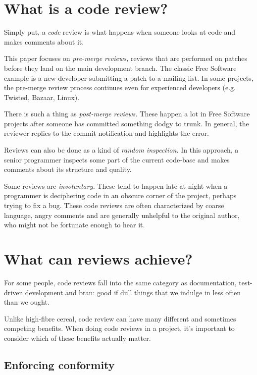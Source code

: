 \documentclass{article}
\begin{document}
\section{What is a code review?}

Simply put, a {\it code} review is what happens when someone looks at code and makes comments about it.

This paper focuses on {\it pre-merge reviews,} reviews that are performed on patches before they land on the main development branch. The classic Free Software example is a new developer submitting a patch to a mailing list. In some projects, the pre-merge review process continues even for experienced developers (e.g. Twisted, Bazaar, Linux).

There is such a thing as {\it post-merge reviews.} These happen a lot in Free Software projects after someone has committed something dodgy to trunk. In general, the reviewer replies to the commit notification and highlights the error.

Reviews can also be done as a kind of {\it random inspection.} In this approach, a senior programmer inspects some part of the current code-base and makes comments about its structure and quality.

Some reviews are {\it involuntary.} These tend to happen late at night when a programmer is deciphering code in an obscure corner of the project, perhaps trying to fix a bug. These code reviews are often characterized by coarse language, angry comments and are generally unhelpful to the original author, who might not be fortunate enough to hear it. 


\section{What can reviews achieve?}

For some people, code reviews fall into the same category as documentation, test-driven development and bran: good if dull things that we indulge in less often than we ought.

Unlike high-fibre cereal, code review can have many different and sometimes competing benefits. When doing code reviews in a project, it's important to consider which of these benefits actually matter. 


\subsection{Enforcing conformity}
\end{document}
